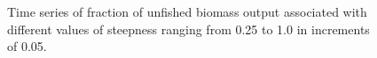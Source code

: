 \documentclass[
]{scrartcl}
\begin{document}
\begin{figure}


\caption{\label{fig-steep-bratio}Time series of fraction of unfished
biomass output associated with different values of steepness ranging
from 0.25 to 1.0 in increments of 0.05.}

\end{figure}%
\end{document}
